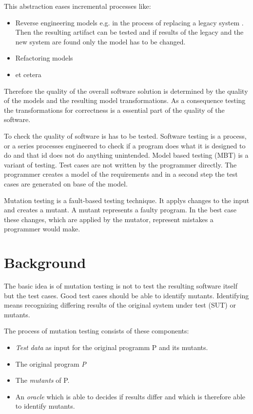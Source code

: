 \documentclass{llncs}
\begin{document}
This abstraction eases incremental processes like:\cite{Sendall:2003}
\begin{itemize}
	\item Reverse engineering models e.g. in the process of replacing a legacy system . Then the resulting artifact can be tested and if results of the legacy and the new system are found only the model has to be changed.
	\item Refactoring models
	\item et cetera
\end{itemize}

Therefore the quality of the overall software solution is determined by the quality of the models and the resulting model transformations.\cite{Hutchinson:2011} As a consequence testing the transformations for correctness is a essential part of the quality of the software.\cite{troya:2015}

To check the quality of software is has to be tested. Software testing is a process, or a series processes engineered to check if a program does what it is designed to do and that id does not do anything unintended.\cite{Myers:2004} Model based testing (MBT) is a variant of testing. Test cases are not written by the programmer directly. The programmer creates a model of the requirements and in a second step the test cases are generated on base of the model.\cite{Utting:2012}

Mutation testing is a fault-based testing technique. It applys changes to the input and creates a mutant. A mutant represents a faulty program. In the best case these changes, which are applied by the mutator, represent mistakes a programmer would make.\cite{mutationssurvey:yue}

\section{Background}

The basic idea is of mutation testing is not to test the resulting software itself but the test cases. Good test cases should be able to identify mutants. Identifying means recognizing differing results of the original system under test (SUT) or mutants.\cite{MatMottu2006}

The process of mutation testing consists of these components:
\begin{itemize}
	\item \textit{Test data} as input for the original programm P and its mutants.
	\item The original program \textit{P}
	\item The \textit{mutants} of P.
	\item An \textit{oracle} which is able to decides if results differ and which is therefore able to identify mutants.
\end{itemize}
\end{document}
